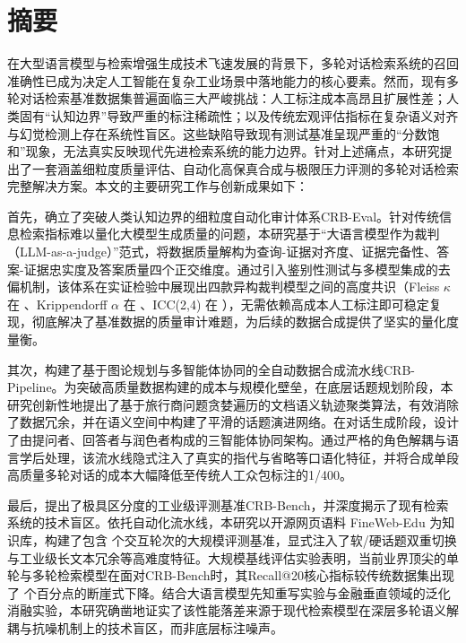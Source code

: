 \chapter{摘\quad 要}%
\linespread{1.5}

在大型语言模型与检索增强生成技术飞速发展的背景下，多轮对话检索系统的召回准确性已成为决定人工智能在复杂工业场景中落地能力的核心要素。然而，现有多轮对话检索基准数据集普遍面临三大严峻挑战：人工标注成本高昂且扩展性差；人类固有“认知边界”导致严重的标注稀疏性；以及传统宏观评估指标在复杂语义对齐与幻觉检测上存在系统性盲区。这些缺陷导致现有测试基准呈现严重的“分数饱和”现象，无法真实反映现代先进检索系统的能力边界。针对上述痛点，本研究提出了一套涵盖细粒度质量评估、自动化高保真合成与极限压力评测的多轮对话检索完整解决方案。本文的主要研究工作与创新成果如下：

首先，确立了突破人类认知边界的细粒度自动化审计体系CRB-Eval。针对传统信息检索指标难以量化大模型生成质量的问题，本研究基于“大语言模型作为裁判（LLM-as-a-judge）”范式，将数据质量解构为查询-证据对齐度、证据完备性、答案-证据忠实度及答案质量四个正交维度。通过引入鉴别性测试与多模型集成的去偏机制，该体系在实证检验中展现出四款异构裁判模型之间的高度共识（Fleiss $\kappa$ 在  、Krippendorff $\alpha$ 在 、ICC(2,4) 在 ），无需依赖高成本人工标注即可稳定复现，彻底解决了基准数据的质量审计难题，为后续的数据合成提供了坚实的量化度量衡。

其次，构建了基于图论规划与多智能体协同的全自动数据合成流水线CRB-Pipeline。为突破高质量数据构建的成本与规模化壁垒，在底层话题规划阶段，本研究创新性地提出了基于旅行商问题贪婪遍历的文档语义轨迹聚类算法，有效消除了数据冗余，并在语义空间中构建了平滑的话题演进网络。在对话生成阶段，设计了由提问者、回答者与润色者构成的三智能体协同架构。通过严格的角色解耦与语言学后处理，该流水线隐式注入了真实的指代与省略等口语化特征，并将合成单段高质量多轮对话的成本大幅降低至传统人工众包标注的1/400。

最后，提出了极具区分度的工业级评测基准CRB-Bench，并深度揭示了现有检索系统的技术盲区。依托自动化流水线，本研究以开源网页语料 FineWeb-Edu 为知识库，构建了包含  个交互轮次的大规模评测基准，显式注入了软/硬话题双重切换与工业级长文本冗余等高难度特征。大规模基线评估实验表明，当前业界顶尖的单轮与多轮检索模型在面对CRB-Bench时，其Recall@20核心指标较传统数据集出现了  个百分点的断崖式下降。结合大语言模型先知重写实验与金融垂直领域的泛化消融实验，本研究确凿地证实了该性能落差来源于现代检索模型在深层多轮语义解耦与抗噪机制上的技术盲区，而非底层标注噪声。

